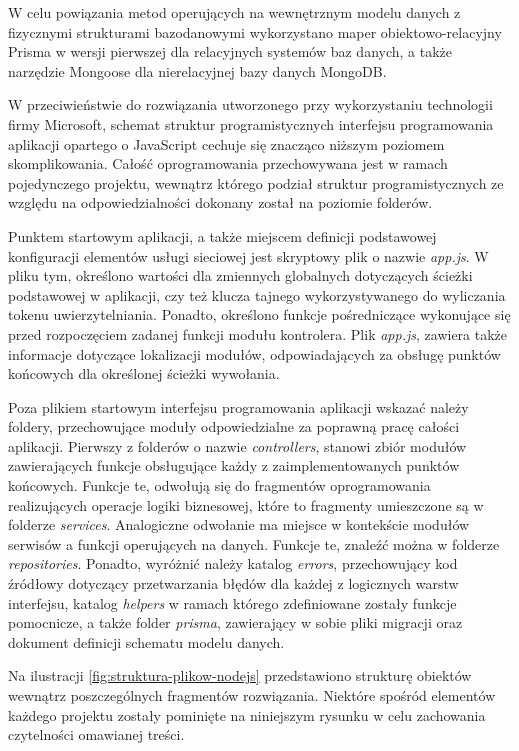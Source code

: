 W celu powiązania metod operujących na wewnętrznym modelu danych z fizycznymi strukturami bazodanowymi wykorzystano maper obiektowo-relacyjny Prisma w wersji pierwszej dla relacyjnych systemów baz danych, a także narzędzie Mongoose dla nierelacyjnej bazy danych MongoDB.

W przeciwieństwie do rozwiązania utworzonego przy wykorzystaniu technologii firmy Microsoft, schemat struktur programistycznych interfejsu programowania aplikacji opartego o JavaScript cechuje się znacząco niższym poziomem skomplikowania. Całość oprogramowania przechowywana jest w ramach pojedynczego projektu, wewnątrz którego podział struktur programistycznych ze względu na odpowiedzialności dokonany został na poziomie folderów.

Punktem startowym aplikacji, a także miejscem definicji podstawowej konfiguracji elementów usługi sieciowej jest skryptowy plik o nazwie \textit{app.js}. W pliku tym, określono wartości dla zmiennych globalnych dotyczących ścieżki podstawowej w aplikacji, czy też klucza tajnego wykorzystywanego do wyliczania tokenu uwierzytelniania. Ponadto, określono funkcje pośredniczące wykonujące się przed rozpoczęciem zadanej funkcji modułu kontrolera. Plik \textit{app.js}, zawiera także informacje dotyczące lokalizacji modułów, odpowiadających za obsługę punktów końcowych dla określonej ścieżki wywołania.

Poza plikiem startowym interfejsu programowania aplikacji wskazać należy foldery, przechowujące moduły odpowiedzialne za poprawną pracę całości aplikacji. Pierwszy z folderów o nazwie \textit{controllers}, stanowi zbiór modułów zawierających funkcje obsługujące każdy z zaimplementowanych punktów końcowych. Funkcje te, odwołują się do fragmentów oprogramowania realizujących operacje logiki biznesowej, które to fragmenty umieszczone są w folderze \textit{services}. Analogiczne odwołanie ma miejsce w kontekście modułów serwisów a funkcji operujących na danych. Funkcje te, znaleźć można w folderze \textit{repositories}. Ponadto, wyróżnić należy katalog \textit{errors}, przechowujący kod źródłowy dotyczący przetwarzania błędów dla każdej z logicznych warstw interfejsu, katalog \textit{helpers} w ramach którego zdefiniowane zostały funkcje pomocnicze, a także folder \textit{prisma}, zawierający w sobie pliki migracji oraz dokument definicji schematu modelu danych.

Na ilustracji \ref{fig:struktura-plikow-nodejs} przedstawiono strukturę obiektów wewnątrz poszczególnych fragmentów rozwiązania. Niektóre spośród elementów każdego projektu zostały pominięte na niniejszym rysunku w celu zachowania czytelności omawianej treści.

